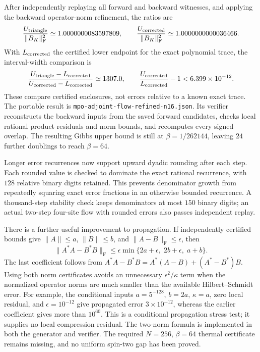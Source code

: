 \documentclass[11pt]{article}
\begin{document}
After independently replaying all forward and backward witnesses,
and applying the backward operator-norm refinement, the ratios are
\[
 \frac{U_{\rm triangle}}{\|B_K\|_{\mathrm F}^2}
 \simeq1.0000000083597809,\qquad
 \frac{U_{\rm corrected}}{\|B_K\|_{\mathrm F}^2}
 \simeq1.0000000000036466.
\]
With $L_{\rm corrected}$ the certified lower endpoint for the exact
polynomial trace, the interval-width comparison is
\[
 \frac{U_{\rm triangle}-L_{\rm corrected}}
      {U_{\rm corrected}-L_{\rm corrected}}
 \simeq1307.0,
 \qquad
 \frac{U_{\rm corrected}}{L_{\rm corrected}}-1
 <6.399\times10^{-12}.
\]
These compare certified enclosures, not errors relative to a known exact
trace. The portable result is
\texttt{mpo-adjoint-flow-refined-n16.json}. Its verifier reconstructs
the backward inputs from the saved forward candidates, checks local
rational product residuals and norm bounds, and recomputes every signed
overlap. The resulting Gibbs upper bound is still at
$\beta=1/262144$, leaving $24$ further doublings to reach $\beta=64$.

Longer error recurrences now support upward dyadic rounding after each
step. Each rounded value is checked to dominate the exact rational
recurrence, with $128$ relative binary digits retained. This prevents
denominator growth from repeatedly squaring exact error fractions
in an otherwise bounded recurrence. A thousand-step stability check
keeps denominators at most $150$ binary digits; an actual two-step
four-site flow with rounded errors also passes independent replay.

There is a further useful improvement to propagation. If independently
certified bounds give $\|A\|\le a$, $\|B\|\le b$, and
$\|A-B\|_{\mathrm F}\le\epsilon$, then
\[
 \|A^*A-B^*B\|_{\mathrm F}
 \le\epsilon\min\{2a+\epsilon,\;2b+\epsilon,\;a+b\}.
\]
The last coefficient follows from
$A^*A-B^*B=A^*(A-B)+(A^*-B^*)B$.
Using both norm certificates avoids an unnecessary
$\epsilon^2/\kappa$ term when the normalized operator norms are much
smaller than the available Hilbert--Schmidt error. For example, the
conditional inputs $a=5^{-128}$, $b=2a$, $\kappa=a$, zero local residual,
and $\epsilon=10^{-12}$ give propagated error $3\times10^{-12}$,
whereas the earlier coefficient gives more than $10^{60}$.
This is a conditional propagation stress test; it supplies no local
compression residual. The two-norm formula is
implemented in both the generator and verifier.
The required $N=256$, $\beta=64$ thermal certificate remains missing,
and no uniform spin-two gap has been proved.
\end{document}
